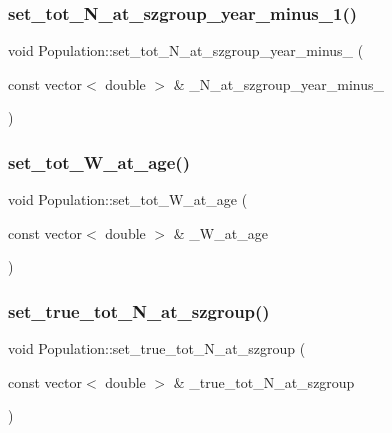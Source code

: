 \subsubsection{\texorpdfstring{set\_tot\_N\_at\_szgroup\_year\_minus\_1()}{set\_tot\_N\_at\_szgroup\_year\_minus\_1()}}
{\footnotesize\ttfamily void Population\+::set\+\_\+tot\+\_\+\+N\+\_\+at\+\_\+szgroup\+\_\+year\+\_\+minus\+\_ (\begin{DoxyParamCaption}\item[{const vector$<$ double $>$ \&}]{\+\_\+\+N\+\_\+at\+\_\+szgroup\+\_\+year\+\_\+minus\+\_ }\end{DoxyParamCaption})}

\mbox{\label{class_population_a2db609afbba5d88acb379b2c15e76ff6}} 
\subsubsection{\texorpdfstring{set\_tot\_W\_at\_age()}{set\_tot\_W\_at\_age()}}
{\footnotesize\ttfamily void Population\+::set\+\_\+tot\+\_\+\+W\+\_\+at\+\_\+age (\begin{DoxyParamCaption}\item[{const vector$<$ double $>$ \&}]{\+\_\+\+W\+\_\+at\+\_\+age }\end{DoxyParamCaption})}

\mbox{\label{class_population_a1e9f13e5b19815245325c9b4f1b8dcf8}} 
\subsubsection{\texorpdfstring{set\_true\_tot\_N\_at\_szgroup()}{set\_true\_tot\_N\_at\_szgroup()}}
{\footnotesize\ttfamily void Population\+::set\+\_\+true\+\_\+tot\+\_\+\+N\+\_\+at\+\_\+szgroup (\begin{DoxyParamCaption}\item[{const vector$<$ double $>$ \&}]{\+\_\+true\+\_\+tot\+\_\+\+N\+\_\+at\+\_\+szgroup }\end{DoxyParamCaption})}

\mbox{\label{class_population_a74eb37544d99f1288d4d5f089d044c59}} 

